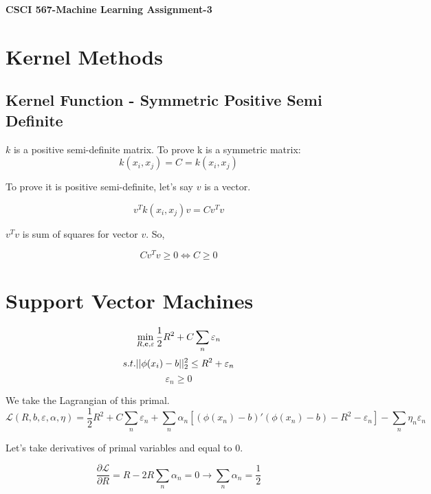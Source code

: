 \documentclass[letter,11pt]{article}
\begin{document}
	\begin{center}
		\Large\textbf{CSCI 567-Machine Learning Assignment-3}
	\end{center}
	
	\section{Kernel Methods}
	\subsection{Kernel Function - Symmetric Positive Semi Definite}
	$k$ is a positive semi-definite matrix. To prove k is a symmetric matrix:
	$$k(x_i,x_j) = C = k(x_i,x_j)$$
	
	To prove it is positive semi-definite, let's say $v$ is a vector.
	
	$$v^Tk(x_i,x_j)v = C v^Tv $$
	
	$v^Tv$ is sum of squares for vector $v$. So,
	
	$$C v^Tv \geq 0 \iff C \geq 0$$
	
	\section{Support Vector Machines}


	\begin{equation}
		 \min_{R,\textbf{c},\varepsilon}\frac{1}{2}R^2 + C\sum_{n}\varepsilon_n \\
	\end{equation}
	\begin{equation}
		s.t. ||\phi(x_i) - b||_2^2 \leq R^2 + \varepsilon_n \\
	\end{equation}
	\begin{equation}
		\varepsilon_n \geq 0
	\end{equation}
	
	We take the Lagrangian of this primal.
	\begin{equation}
	 \mathcal{L}(R,b,\varepsilon,\alpha,\eta) = \frac{1}{2}R^2 + C \sum_{n} \varepsilon_n + \sum_{n} \alpha_n[(\phi(x_n)-b)'(\phi(x_n)-b)-R^2-\varepsilon_n] - \sum_{n}\eta_n\varepsilon_n 
	\end{equation}
	
	Let's take derivatives of primal variables and equal to 0.
	
	\begin{equation}
	\frac{\partial \mathcal{L}}{\partial R} = R - 2R \sum_{n} \alpha_n = 0 \rightarrow \sum_{n} \alpha_n = \frac{1}{2}
	\end{equation}
	
\end{document}
